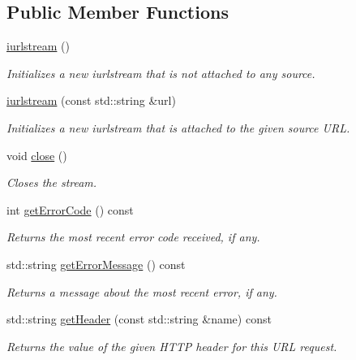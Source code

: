 \subsection*{Public Member Functions}
\begin{DoxyCompactItemize}
\item 
\mbox{\hyperlink{classiurlstream_aa78011981facda77bed9acf0e88ebdab}{iurlstream}} ()
\begin{DoxyCompactList}\small\item\em Initializes a new iurlstream that is not attached to any source. \end{DoxyCompactList}\item 
\mbox{\hyperlink{classiurlstream_a5fa5ba70cbe8c2ad3f93876c381464cb}{iurlstream}} (const std\+::string \&url)
\begin{DoxyCompactList}\small\item\em Initializes a new iurlstream that is attached to the given source U\+RL. \end{DoxyCompactList}\item 
void \mbox{\hyperlink{classiurlstream_a5ae591df94fc66ccb85cbb6565368bca}{close}} ()
\begin{DoxyCompactList}\small\item\em Closes the stream. \end{DoxyCompactList}\item 
int \mbox{\hyperlink{classiurlstream_a9e79924a3e50273b08ab5b3a8c12a221}{get\+Error\+Code}} () const
\begin{DoxyCompactList}\small\item\em Returns the most recent error code received, if any. \end{DoxyCompactList}\item 
std\+::string \mbox{\hyperlink{classiurlstream_adf0cc934eff26878cdf2018259997a4a}{get\+Error\+Message}} () const
\begin{DoxyCompactList}\small\item\em Returns a message about the most recent error, if any. \end{DoxyCompactList}\item 
std\+::string \mbox{\hyperlink{classiurlstream_a736d777b29179f52ba753317d84b1087}{get\+Header}} (const std\+::string \&name) const
\begin{DoxyCompactList}\small\item\em Returns the value of the given H\+T\+TP header for this U\+RL request. \end{DoxyCompactList}\item 

\end{DoxyCompactItemize}
